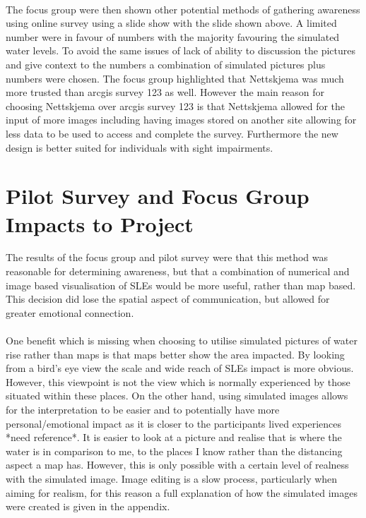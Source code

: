 \paragraph{}
The focus group were then shown other potential methods of gathering awareness using online survey using a slide show with the slide shown above. A limited number were in favour of numbers with the majority favouring the simulated water levels. To avoid the same issues of lack of ability to discussion the pictures and give context to the numbers a combination of simulated pictures plus numbers were chosen. 
The focus group highlighted that Nettskjema was much more trusted than arcgis survey 123 as well. However the main reason for choosing Nettskjema over arcgis survey 123 is that Nettskjema allowed for the input of more images including having images stored on another site allowing for less data to be used to access and complete the survey. Furthermore the new design is better suited for individuals with sight impairments.   

\section{Pilot Survey and Focus Group Impacts to Project}
The results of the focus group and pilot survey were that this method was reasonable for determining awareness, but that a combination of numerical and image based visualisation of SLEs would be more useful, rather than map based. This decision did lose the spatial aspect of communication, but allowed for greater emotional connection.

\paragraph{}


One benefit which is missing when choosing to utilise simulated pictures of water rise rather than maps is that maps better show the area impacted. By looking from a bird’s eye view the scale and wide reach of SLEs impact is more obvious. However, this viewpoint is not the view which is normally experienced by those situated within these places. On the other hand, using simulated images allows for the interpretation to be easier and to potentially have more personal/emotional impact as it is closer to the participants lived experiences *need reference*. It is easier to look at a picture and realise that is where the water is in comparison to me, to the places I know rather than the distancing aspect a map has. However, this is only possible with a certain level of realness with the simulated image. Image editing is a slow process, particularly when aiming for realism, for this reason a full explanation of how the simulated images were created is given  in the appendix. 

